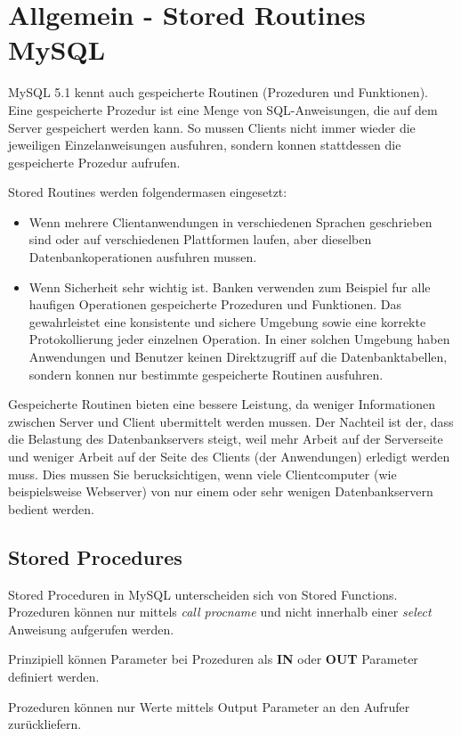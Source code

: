 \section{Allgemein - Stored Routines MySQL}
MySQL 5.1 kennt auch gespeicherte Routinen (Prozeduren und Funktionen). Eine gespeicherte Prozedur ist eine Menge von SQL-Anweisungen, die auf dem Server gespeichert werden kann. So mussen Clients nicht immer wieder die jeweiligen Einzelanweisungen ausfuhren, sondern konnen stattdessen die gespeicherte Prozedur aufrufen.

Stored Routines werden folgendermasen eingesetzt:
\begin{itemize}
	\item Wenn mehrere Clientanwendungen in verschiedenen Sprachen geschrieben sind oder auf verschiedenen Plattformen laufen, aber dieselben Datenbankoperationen ausfuhren mussen.
	\item Wenn Sicherheit sehr wichtig ist. Banken verwenden zum Beispiel fur alle haufigen Operationen gespeicherte Prozeduren und Funktionen. Das gewahrleistet eine konsistente und sichere Umgebung sowie eine korrekte Protokollierung jeder einzelnen Operation. In einer solchen Umgebung haben Anwendungen und Benutzer keinen Direktzugriff auf die Datenbanktabellen, sondern konnen nur bestimmte gespeicherte Routinen ausfuhren.
\end{itemize}
Gespeicherte Routinen bieten eine bessere Leistung, da weniger Informationen zwischen Server und Client ubermittelt werden mussen. Der Nachteil ist der, dass die Belastung des Datenbankservers steigt, weil mehr Arbeit auf der Serverseite und weniger Arbeit auf der Seite des Clients (der Anwendungen) erledigt werden muss. Dies mussen Sie berucksichtigen, wenn viele Clientcomputer (wie beispielsweise Webserver) von nur einem oder sehr wenigen Datenbankservern bedient werden.
\subsection{Stored Procedures}
Stored Proceduren in MySQL unterscheiden sich von Stored Functions.
Prozeduren können nur mittels \textit{call procname} und nicht innerhalb einer \textit{select} Anweisung aufgerufen werden.

Prinzipiell können Parameter bei Prozeduren als \textbf{IN} oder \textbf{OUT} Parameter definiert werden.

Prozeduren können nur Werte mittels Output Parameter an den Aufrufer zurückliefern.


